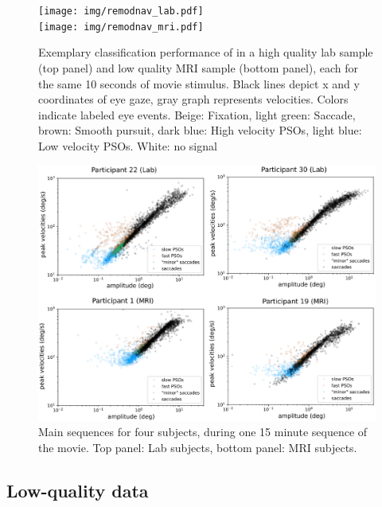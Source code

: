 \begin{figure}[h!]
  \texttt{[image: img/remodnav\_lab.pdf]} \\
  \texttt{[image: img/remodnav\_mri.pdf]}\\
  \caption{Exemplary classification performance of \remodnav in a high quality lab sample (top panel) and low
  quality MRI sample (bottom panel), each for the same 10 seconds of movie stimulus.
  Black lines depict x and y coordinates of eye gaze, gray graph represents velocities. Colors indicate labeled
  eye events. Beige: Fixation,
  light green: Saccade, brown: Smooth pursuit, dark blue: High velocity PSOs, light blue: Low velocity PSOs.
  White: no signal}
  \label{fig:remodnav}
\end{figure}

\begin{figure}[h!]
  \includegraphics[width=1\textwidth]{img/main_sequences.eps}
  \caption{Main sequences for four subjects, during one 15 minute sequence of
  the movie. Top panel: Lab subjects, bottom panel: MRI subjects.}
  \label{fig:mains}
\end{figure}

\subsection*{Low-quality data}\label{ana_3}

